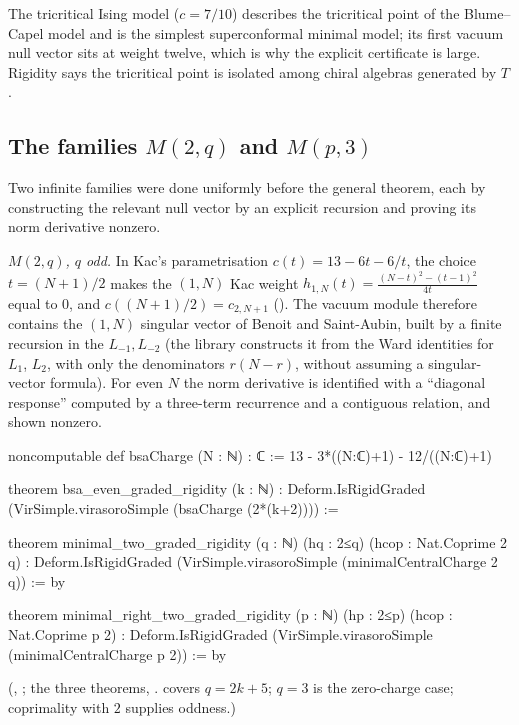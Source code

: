 \begin{physics}
The tricritical Ising model ($c=7/10$) describes the tricritical point of the Blume--Capel model and is the
simplest superconformal minimal model; its first vacuum null vector sits at weight twelve, which is why the
explicit certificate is large. Rigidity says the tricritical point is isolated among chiral algebras generated
by $T$.
\end{physics}

\subsection{The families \texorpdfstring{$M(2,q)$}{M(2,q)} and \texorpdfstring{$M(p,3)$}{M(p,3)}}

Two infinite families were done uniformly before the general theorem, each by constructing the relevant null
vector by an explicit recursion and proving its norm derivative nonzero.

\emph{$M(2,q)$, $q$ odd.} In Kac's parametrisation $c(t) = 13-6t-6/t$, the choice $t = (N+1)/2$ makes the
$(1,N)$ Kac weight $h_{1,N}(t) = \frac{(N-t)^2-(t-1)^2}{4t}$ equal to $0$, and $c((N+1)/2) = c_{2,N+1}$
(). The vacuum module therefore contains the $(1,N)$ singular vector of
Benoit and Saint-Aubin, built by a finite recursion in the $L_{-1},L_{-2}$ (the library constructs it from the
Ward identities for $L_1$, $L_2$, with only the denominators $r(N-r)$, without assuming a singular-vector
formula). For even $N$ the norm derivative is identified with a ``diagonal response'' computed by a
three-term recurrence and a contiguous relation, and shown nonzero.
\begin{leancode}
noncomputable def bsaCharge (N : ℕ) : ℂ :=
  13 - 3*((N:ℂ)+1) - 12/((N:ℂ)+1)

theorem bsa_even_graded_rigidity (k : ℕ) :
    Deform.IsRigidGraded (VirSimple.virasoroSimple (bsaCharge (2*(k+2)))) :=

theorem minimal_two_graded_rigidity (q : ℕ) (hq : 2≤q) (hcop : Nat.Coprime 2 q) :
    Deform.IsRigidGraded (VirSimple.virasoroSimple (minimalCentralCharge 2 q)) := by

theorem minimal_right_two_graded_rigidity (p : ℕ) (hp : 2≤p) (hcop : Nat.Coprime p 2) :
    Deform.IsRigidGraded (VirSimple.virasoroSimple (minimalCentralCharge p 2)) := by
\end{leancode}
(, ; the three theorems,
.  covers $q = 2k+5$;
$q = 3$ is the zero-charge case; coprimality with $2$ supplies oddness.)

